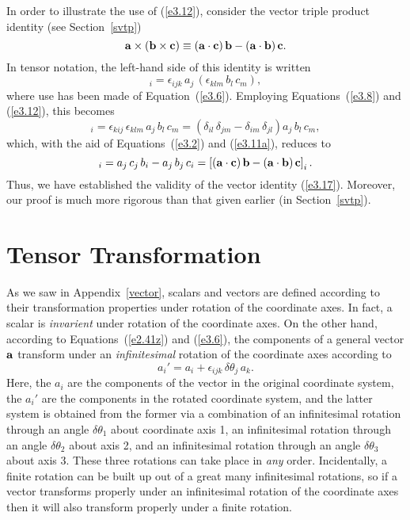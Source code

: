 In order to illustrate the use of (\ref{e3.12}), consider the vector triple product
identity (see Section~\ref{svtp})
\begin{equation}\label{e3.17}
{\bf a}\times ({\bf b}\times {\bf c}) \equiv ({\bf a}\cdot{\bf c})\,{\bf b} - ({\bf a}\cdot{\bf b})\,{\bf c}.
\end{equation}
In tensor notation, the left-hand side of this identity is written
\begin{equation}
[{\bf a}\times ({\bf b}\times {\bf c})]_i = \epsilon_{ijk}\,a_j\,(\epsilon_{klm}\,b_l\,c_m),
\end{equation}
where use has been made of Equation~(\ref{e3.6}).  Employing Equations~(\ref{e3.8}) and (\ref{e3.12}), this
becomes
\begin{equation}
[{\bf a}\times ({\bf b}\times {\bf c})]_i = \epsilon_{kij}\,\epsilon_{klm}\,a_j\,b_l\,c_m = 
\left(\delta_{il}\,\delta_{jm}-\delta_{im}\,\delta_{jl}\right)a_j\,b_l\,c_m,
\end{equation}
which, with the aid of Equations~(\ref{e3.2}) and (\ref{e3.11a}),  reduces to
\begin{equation}
[{\bf a}\times ({\bf b}\times {\bf c})]_i = a_j\,c_j\,b_i - a_j\,b_j\,c_i = \left[({\bf a}\cdot{\bf c})\,{\bf b} - ({\bf a}\cdot{\bf b})\,{\bf c}\right]_i.
\end{equation}
 Thus, we have established the validity of the vector identity (\ref{e3.17}). 
Moreover, our proof is much more rigorous than that given earlier (in Section~\ref{svtp}). 

\section{Tensor Transformation}\label{strans}
As we saw in Appendix~\ref{vector}, scalars and vectors are defined according to their
transformation properties under rotation of the coordinate axes. In fact, a scalar is
{\em invarient}\/ under rotation of the coordinate axes. On the other
hand, according to Equations~(\ref{e2.41z}) and (\ref{e3.6}), the components of a general vector ${\bf a}$ transform under an {\em infinitesimal}\/ 
rotation of the coordinate axes according to
\begin{equation}\label{e3.21}
a_i' = a_i + \epsilon_{ijk} \,\delta\theta_j\,a_k.
\end{equation}
Here, the $a_i$ are the components of the vector in the original coordinate system, the $a_i'$ are the
components in the rotated coordinate system, and the latter system is obtained from the former via
a combination of an infinitesimal rotation through an angle $\delta\theta_1$ about coordinate axis 1, an infinitesimal rotation through an angle $\delta\theta_2$ about axis 2, and an infinitesimal rotation through an angle $\delta\theta_3$ about axis 3. These three  rotations can take place in
{\em any}\/ order. Incidentally, a finite rotation can be built up out of a great many infinitesimal rotations, so if a vector
transforms properly under an infinitesimal rotation of the coordinate axes then it will also transform properly under a finite rotation. 

